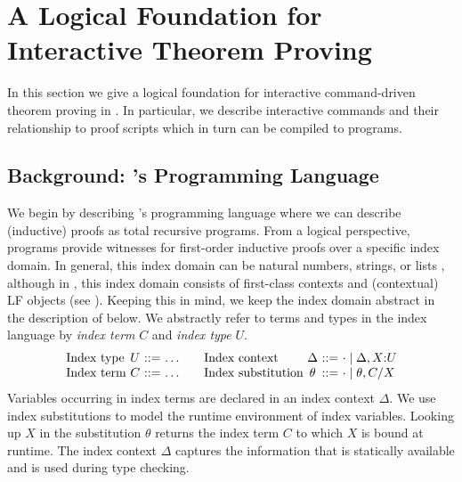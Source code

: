 \renewcommand*{\arraystretch}{1}

\chapter{%
  A Logical Foundation for Interactive Theorem Proving%
}
\label{sec:syntax}

In this section we give a logical foundation for interactive
command-driven theorem proving in \Beluga{}. In particular, we describe interactive
commands and their relationship to proof scripts which in turn can be
compiled to \Beluga{} programs.


\section{%
  Background:  \Beluga's Programming Language%
}
\label{sec:beluga}
We begin by describing \Beluga's programming language where we can
describe (inductive) proofs as total recursive programs. From a
logical perspective, \Beluga{} programs provide witnesses for
first-order inductive proofs over a specific index domain.
In general, this index domain can be natural numbers, strings, or lists
\cite{ChH03Pha,Xi:POPL03}, although in \Beluga{}, this index domain
consists of first-class contexts and (contextual) LF objects (see
\cite{Cave:POPL12}).
Keeping this in mind, we keep the index domain abstract in the
description of \Beluga{} below. We abstractly refer to terms and types
in the index language by \emph{index term} $C$ and \emph{index type}
$U$.
%
\[
  \begin{array}{l@{~}c@{~}r@{~}l@{~~~~~~}l@{~}c@{~}r@{~}l}
  \mbox{Index type} & U & ::= & \ldots  &
    \mbox{Index context} & {\Delta} & ::= & {\cdot \galt \Delta, X{:}U}\\
  \mbox{Index term} & {C} & ::= & {\ldots}    &
    \mbox{Index substitution} & {\theta} & ::= & {\cdot \galt \theta, C/X}
  \end{array}
\]
%
Variables occurring in index terms are declared in an index context
$\Delta$. We use index substitutions to model the runtime environment of index
variables. Looking up $X$ in the substitution $\theta$ returns the
index term $C$ to which $X$ is bound at runtime. The index context
$\Delta$ captures the information that is statically available and is
used during type checking.

